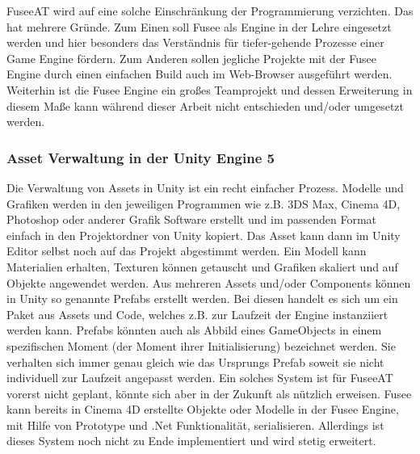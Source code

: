 \documentclass[pagesize, paper=a4, fontsize=12pt, titlepage=true, headings=small, headnosepline, abstractoff, liststotoc, nochapterprefix, plainheadsepline, twoside]{scrreprt}
\begin{document}


FuseeAT wird auf eine solche Einschränkung der Programmierung verzichten. Das hat mehrere Gründe. Zum Einen soll Fusee als Engine in der Lehre eingesetzt werden und hier besonders das Verständnis für tiefer-gehende Prozesse einer Game Engine fördern. Zum Anderen sollen jegliche Projekte mit der Fusee Engine durch einen einfachen Build auch im Web-Browser ausgeführt werden. Weiterhin ist die Fusee Engine ein großes Teamprojekt und dessen Erweiterung in diesem Maße kann während dieser Arbeit nicht entschieden und/oder umgesetzt werden.

\subsubsection{Asset Verwaltung in der Unity Engine 5}
Die Verwaltung von Assets in Unity ist ein recht einfacher Prozess. Modelle und Grafiken werden in den jeweiligen Programmen wie z.B. 3DS Max, Cinema 4D, Photoshop oder anderer Grafik Software erstellt und im passenden Format einfach in den Projektordner von Unity kopiert. Das Asset kann dann im Unity Editor selbst noch auf das Projekt abgestimmt werden. Ein Modell kann Materialien erhalten, Texturen können getauscht und Grafiken skaliert und auf Objekte angewendet werden. Aus mehreren Assets und/oder Components können in Unity so genannte Prefabs erstellt werden. Bei diesen handelt es sich um ein Paket aus Assets und Code, welches z.B. zur Laufzeit der Engine instanziiert werden kann. Prefabs könnten auch als Abbild eines GameObjects in einem spezifischen Moment (der Moment ihrer Initialisierung) bezeichnet werden. Sie verhalten sich immer genau gleich wie das Ursprungs Prefab soweit sie nicht individuell zur Laufzeit angepasst werden. Ein solches System ist für FuseeAT vorerst nicht geplant, könnte sich aber in der Zukunft als nützlich erweisen. Fusee kann bereits in Cinema 4D erstellte Objekte oder Modelle in der Fusee Engine, mit Hilfe von Prototype und .Net Funktionalität, serialisieren. Allerdings ist dieses System noch nicht zu Ende implementiert und wird stetig erweitert.
\end{document}
